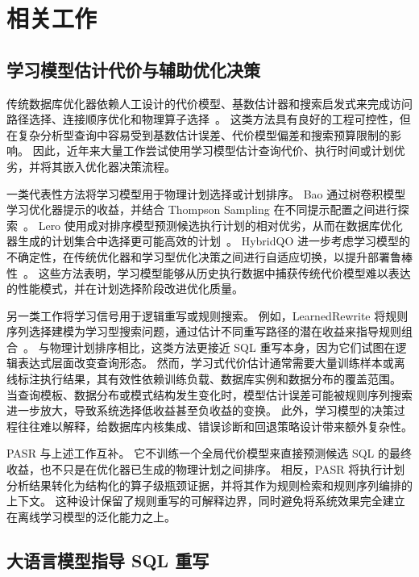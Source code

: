 \section{相关工作}
\label{sec:related-work}

\subsection{学习模型估计代价与辅助优化决策}

传统数据库优化器依赖人工设计的代价模型、基数估计器和搜索启发式来完成访问路径选择、连接顺序优化和物理算子选择~\cite{selinger1979access,chaudhuri1998overview}。
这类方法具有良好的工程可控性，但在复杂分析型查询中容易受到基数估计误差、代价模型偏差和搜索预算限制的影响。
因此，近年来大量工作尝试使用学习模型估计查询代价、执行时间或计划优劣，并将其嵌入优化器决策流程。

一类代表性方法将学习模型用于物理计划选择或计划排序。
Bao 通过树卷积模型学习优化器提示的收益，并结合 Thompson Sampling 在不同提示配置之间进行探索~\cite{marcus2021bao}。
Lero 使用成对排序模型预测候选执行计划的相对优劣，从而在数据库优化器生成的计划集合中选择更可能高效的计划~\cite{zhu2023lero}。
HybridQO 进一步考虑学习模型的不确定性，在传统优化器和学习型优化决策之间进行自适应切换，以提升部署鲁棒性~\cite{yu2022hybridqo}。
这些方法表明，学习模型能够从历史执行数据中捕获传统代价模型难以表达的性能模式，并在计划选择阶段改进优化质量。

另一类工作将学习信号用于逻辑重写或规则搜索。
例如，LearnedRewrite 将规则序列选择建模为学习型搜索问题，通过估计不同重写路径的潜在收益来指导规则组合~\cite{zhou2023learnedrewrite}。
与物理计划排序相比，这类方法更接近 SQL 重写本身，因为它们试图在逻辑表达式层面改变查询形态。
然而，学习式代价估计通常需要大量训练样本或离线标注执行结果，其有效性依赖训练负载、数据库实例和数据分布的覆盖范围。
当查询模板、数据分布或模式结构发生变化时，模型估计误差可能被规则序列搜索进一步放大，导致系统选择低收益甚至负收益的变换。
此外，学习模型的决策过程往往难以解释，给数据库内核集成、错误诊断和回退策略设计带来额外复杂性。

PASR 与上述工作互补。
它不训练一个全局代价模型来直接预测候选 SQL 的最终收益，也不只是在优化器已生成的物理计划之间排序。
相反，PASR 将执行计划分析结果转化为结构化的算子级瓶颈证据，并将其作为规则检索和规则序列编排的上下文。
这种设计保留了规则重写的可解释边界，同时避免将系统效果完全建立在离线学习模型的泛化能力之上。

\subsection{大语言模型指导 SQL 重写}

